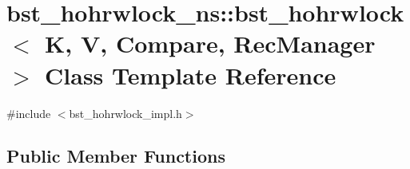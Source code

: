 \hypertarget{classbst__hohrwlock__ns_1_1bst__hohrwlock}{}\section{bst\+\_\+hohrwlock\+\_\+ns\+:\+:bst\+\_\+hohrwlock$<$ K, V, Compare, Rec\+Manager $>$ Class Template Reference}
\label{classbst__hohrwlock__ns_1_1bst__hohrwlock}


{\ttfamily \#include $<$bst\+\_\+hohrwlock\+\_\+impl.\+h$>$}

\subsection*{Public Member Functions}
